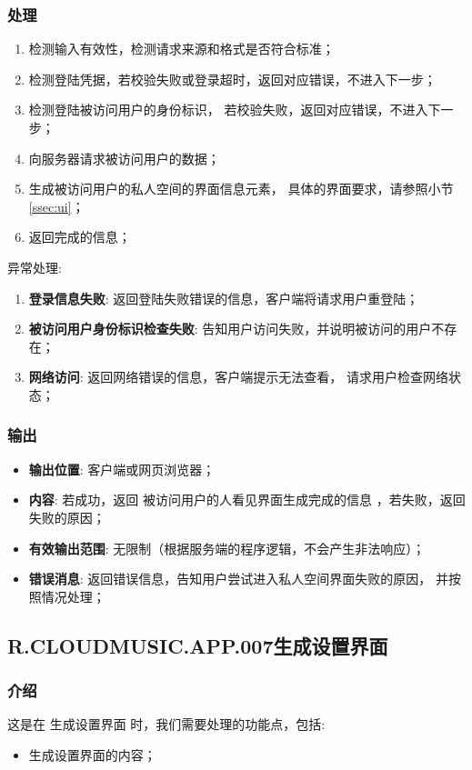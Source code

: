 {\subsubsection{处理}
	\begin{enumerate}
		\item 检测输入有效性，检测请求来源和格式是否符合标准；
		\item 检测登陆凭据，若校验失败或登录超时，返回对应错误，不进入下一步；
		\item 检测登陆被访问用户的身份标识，
			若校验失败，返回对应错误，不进入下一步；
		\item 向服务器请求被访问用户的数据；
		\item 生成被访问用户的私人空间的界面信息元素，
			具体的界面要求，请参照小节\ref{ssec:ui}；
		\item 返回完成的信息；
	\end{enumerate}
	\noindent 异常处理: 
	\begin{enumerate}
		\item \textbf{登录信息失败}: 返回登陆失败错误的信息，客户端将请求用户重登陆；
		\item \textbf{被访问用户身份标识检查失败}: 告知用户访问失败，并说明被访问的用户不存在；
		\item \textbf{网络访问}: 返回网络错误的信息，客户端提示无法查看，
			请求用户检查网络状态；
	\end{enumerate}
\subsubsection{输出}
\begin{itemize}
	\item \textbf{输出位置}: 客户端或网页浏览器；
	\item \textbf{内容}: 若成功，返回 被访问用户的人看见界面生成完成的信息 ，若失败，返回 失败的原因；
	\item \textbf{有效输出范围}: 无限制（根据服务端的程序逻辑，不会产生非法响应）；
	\item \textbf{错误消息}: 返回错误信息，告知用户尝试进入私人空间界面失败的原因，
		并按照情况处理；
\end{itemize}
}
\fi 
\subsection{R.CLOUDMUSIC.APP.007生成设置界面}
\subsubsection{介绍}
	这是在 生成设置界面 时，我们需要处理的功能点，包括: 
	\begin{itemize}
		\item 生成设置界面的内容；
	\end{itemize}
